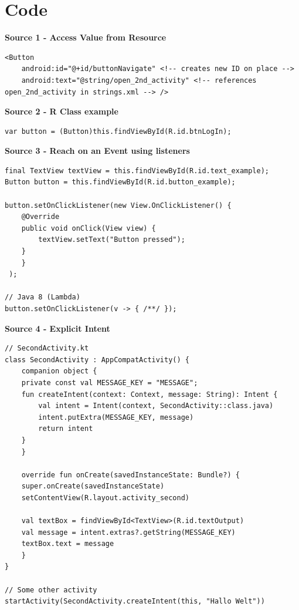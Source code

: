 \documentclass[11pt,twoside,landscape]{article}
\begin{document}
\section{Code}
\label{sec:orgab9ac94}
\textbf{Source 1 - Access Value from Resource}

\lstset{language=XML,label= ,caption= ,captionpos=b,numbers=none}
\begin{lstlisting}
<Button
    android:id="@+id/buttonNavigate" <!-- creates new ID on place -->
    android:text="@string/open_2nd_activity" <!-- references open_2nd_activity in strings.xml --> />
\end{lstlisting}

\textbf{Source 2 - R Class example}

\lstset{language=java,label= ,caption= ,captionpos=b,numbers=none}
\begin{lstlisting}
var button = (Button)this.findViewById(R.id.btnLogIn);
\end{lstlisting}

\textbf{Source 3 - Reach on an Event using listeners}

\lstset{language=java,label= ,caption= ,captionpos=b,numbers=none}
\begin{lstlisting}
final TextView textView = this.findViewById(R.id.text_example);
Button button = this.findViewById(R.id.button_example);

button.setOnClickListener(new View.OnClickListener() {
	@Override
	public void onClick(View view) {
	    textView.setText("Button pressed");
	}
    }
 );

// Java 8 (Lambda)
button.setOnClickListener(v -> { /**/ });
\end{lstlisting}

\textbf{Source 4 - Explicit Intent}

\lstset{language=kotlin,label= ,caption= ,captionpos=b,numbers=none}
\begin{lstlisting}
// SecondActivity.kt
class SecondActivity : AppCompatActivity() {
    companion object {
	private const val MESSAGE_KEY = "MESSAGE";
	fun createIntent(context: Context, message: String): Intent {
	    val intent = Intent(context, SecondActivity::class.java)
	    intent.putExtra(MESSAGE_KEY, message)
	    return intent
	}
    }

    override fun onCreate(savedInstanceState: Bundle?) {
	super.onCreate(savedInstanceState)
	setContentView(R.layout.activity_second)

	val textBox = findViewById<TextView>(R.id.textOutput)
	val message = intent.extras?.getString(MESSAGE_KEY)
	textBox.text = message
    }
}

// Some other activity
startActivity(SecondActivity.createIntent(this, "Hallo Welt"))
\end{lstlisting}
\end{document}

